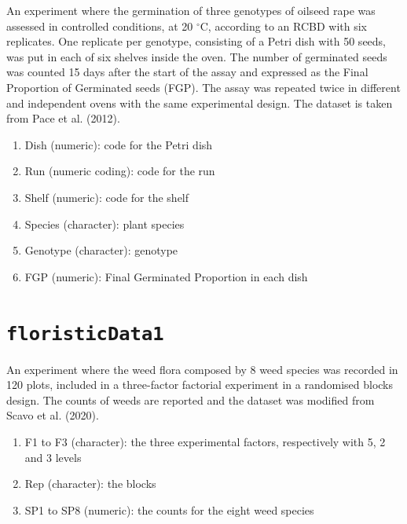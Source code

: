 \documentclass[
  letterpaper,
  DIV=11,
  numbers=noendperiod]{scrreprt}
\providecommand{\tightlist}{%
  \setlength{\itemsep}{0pt}\setlength{\parskip}{0pt}}
\begin{document}

An experiment where the germination of three genotypes of oilseed rape
was assessed in controlled conditions, at 20 \(^{\circ}\)C, according to
an RCBD with six replicates. One replicate per genotype, consisting of a
Petri dish with 50 seeds, was put in each of six shelves inside the
oven. The number of germinated seeds was counted 15 days after the start
of the assay and expressed as the Final Proportion of Germinated seeds
(FGP). The assay was repeated twice in different and independent ovens
with the same experimental design. The dataset is taken from Pace et al.
(2012).

\begin{enumerate}
\def\labelenumi{\arabic{enumi}.}
\tightlist
\item
  Dish (numeric): code for the Petri dish
\item
  Run (numeric coding): code for the run
\item
  Shelf (numeric): code for the shelf
\item
  Species (character): plant species
\item
  Genotype (character): genotype
\item
  FGP (numeric): Final Germinated Proportion in each dish
\end{enumerate}

\section*{\texorpdfstring{\texttt{floristicData1}}{floristicData1}}\label{floristicData1}


An experiment where the weed flora composed by 8 weed species was
recorded in 120 plots, included in a three-factor factorial experiment
in a randomised blocks design. The counts of weeds are reported and the
dataset was modified from Scavo et al. (2020).

\begin{enumerate}
\def\labelenumi{\arabic{enumi}.}
\tightlist
\item
  F1 to F3 (character): the three experimental factors, respectively
  with 5, 2 and 3 levels
\item
  Rep (character): the blocks
\item
  SP1 to SP8 (numeric): the counts for the eight weed species
\end{enumerate}
\end{document}

